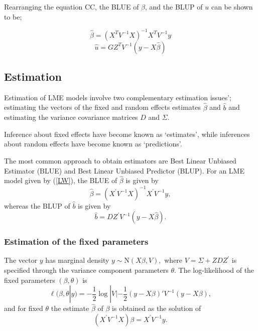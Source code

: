 \documentclass[12pt, a4paper]{report}
\theoremstyle{plain}
\theoremstyle{definition}
\theoremstyle{remark}
\begin{document}
Rearranging the equation CC, the BLUE of $\beta$, and the BLUP of
$u$ can be shown to be;

\begin{equation}
\hat{\beta} = (X^{T}V^{-1}X)^{-1}X^{T}V^{-1}y
\end{equation}
\begin{equation}
\hat{u} = GZ^{T}V^{-1}(y-X\hat{\beta})
\end{equation}


\subsection{Estimation}
Estimation of LME models involve two complementary estimation issues'; estimating the vectors of the fixed and random effects estimates $\hat{\beta}$ and $\hat{b}$ and estimating the variance covariance matrices $D$ and $\Sigma$.

Inference about fixed effects have become known as `estimates', while inferences about random effects have become known as `predictions'. 

The most common approach to obtain estimators are Best Linear Unbiased Estimator (BLUE) and Best Linear Unbiased Predictor (BLUP). For an LME model given by (\ref{LW}), the BLUE of $\hat{\beta}$ is given by
\[\hat{\beta} = (X^\prime V^{-1}X)^{-1}X^\prime V^{-1}y,\]whereas the BLUP of $\hat{b}$ is given by
\[\hat{b} = DZ^{\prime} V^{-1} (y-X\hat{\beta}).\]

\newpage
\subsubsection*{Estimation of the fixed parameters}

The vector $y$ has marginal density $y \sim \mathrm{N}(X \beta,V),$ where $V = \Sigma + ZDZ^\prime$ is specified through the variance component parameters $\theta.$ The log-likelihood of the fixed parameters $(\beta, \theta)$ is
\begin{equation}
\ell (\beta, \theta|y) =
-\frac{1}{2} \log |V| -\frac{1}{2}(y -
X \beta)'V^{-1}(y -
X \beta), \label{Likelihood:MarginalModel}
\end{equation}
and for fixed $\theta$ the estimate $\hat{\beta}$ of $\beta$ is obtained as the solution of
\begin{equation}
(X^\prime V^{-1}X) {\beta} = X^\prime V^{-1}y.
\label{mle:beta:hat}
\end{equation} 
\end{document}
